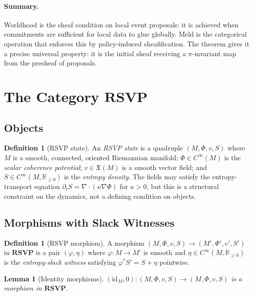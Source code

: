 \documentclass[12pt,a4paper]{article}
\newtheorem{lemma}[theorem]{Lemma}
\theoremstyle{definition}
\newtheorem{definition}[theorem]{Definition}
\theoremstyle{remark}
\newcommand{\Rnn}{\mathbb{R}_{\ge 0}}
\newcommand{\RSVP}{\mathbf{RSVP}}
\providecommand{\id}{\mathrm{id}}
\renewcommand{\id}{\mathrm{id}}
\newcommand{\PhiF}{\Phi}
\newcommand{\vF}{v}
\newcommand{\SF}{S}
\begin{document}
\paragraph{Summary.} Worldhood is the sheaf condition on local event proposals: it is
achieved when commitments are sufficient for local data to glue globally. Meld is the
categorical operation that enforces this by policy-induced sheafification. The theorem
gives it a precise universal property: it is the initial sheaf receiving a $\pi$-invariant
map from the presheaf of proposals.

\section{The Category \texorpdfstring{$\RSVP$}{RSVP}}
\label{sec:rsvp}

\subsection{Objects}

\begin{definition}[RSVP state]
\label{def:rsvp-state}
An \emph{RSVP state} is a quadruple $(M,\PhiF,\vF,\SF)$ where $M$ is a smooth,
connected, oriented Riemannian manifold; $\PhiF\in C^\infty(M)$ is the \emph{scalar
coherence potential}; $\vF\in\mathfrak{X}(M)$ is a smooth vector field; and
$\SF\in C^\infty(M,\Rnn)$ is the \emph{entropy density}. The fields may satisfy
the entropy-transport equation $\partial_t\SF=\nabla\cdot(\kappa\nabla\PhiF)$ for
$\kappa>0$, but this is a structural constraint on the dynamics, not a defining
condition on objects.
\end{definition}

\subsection{Morphisms with Slack Witnesses}

\begin{definition}[RSVP morphism]
\label{def:rsvp-morph}
A morphism $(M,\PhiF,\vF,\SF)\to(M',\PhiF',\vF',\SF')$ in $\RSVP$ is a pair
$(\varphi,\eta)$ where $\varphi:M\to M'$ is smooth and $\eta\in C^\infty(M,\Rnn)$
is the \emph{entropy-slack witness} satisfying $\varphi^*\SF'=\SF+\eta$ pointwise.
\end{definition}

\begin{lemma}[Identity morphisms]
\label{lem:rsvp-id}
$(\id_M,0):(M,\PhiF,\vF,\SF)\to(M,\PhiF,\vF,\SF)$ is a morphism in $\RSVP$.
\end{lemma}
\end{document}
